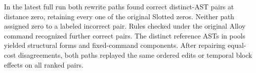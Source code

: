 In the latest full run both rewrite paths found \histPairedZeros{} correct
distinct-AST pairs at distance zero, retaining every one of the
\histStudentSlotted{} original Slotted zeros. Neither path assigned zero to a
labeled incorrect pair. Rules checked under the original Alloy command
recognized \histScopedAdditional{} further correct pairs. The \histReferences{}
distinct reference ASTs in \histPools{} pools yielded \histForms{} structural
forms and \histComponents{} fixed-command components. After repairing
\replayOriginalFailures{} equal-cost disagreements, both paths replayed the
same ordered edits or temporal block effects on all \replayPairs{} ranked pairs.

